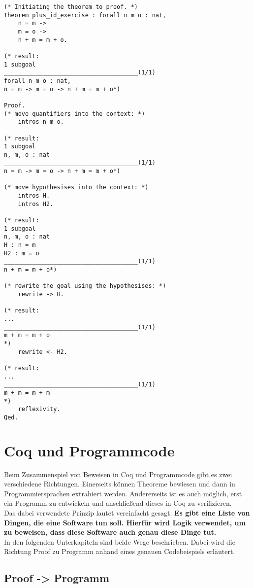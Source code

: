 \begin{lstlisting}[language=coq,firstnumber=1,caption=Coq Beispielbeweis,label=lst:sample-proof2]
(* Initiating the theorem to proof. *)
Theorem plus_id_exercise : forall n m o : nat,
	n = m ->
	m = o ->
	n + m = m + o.
	
(* result: 
1 subgoal
______________________________________(1/1)
forall n m o : nat,
n = m -> m = o -> n + m = m + o*)

Proof.
(* move quantifiers into the context: *)
	intros n m o. 
	
(* result: 
1 subgoal
n, m, o : nat
______________________________________(1/1)
n = m -> m = o -> n + m = m + o*)

(* move hypothesises into the context: *)	
	intros H.
	intros H2.

(* result: 
1 subgoal
n, m, o : nat
H : n = m
H2 : m = o
______________________________________(1/1)
n + m = m + o*)

(* rewrite the goal using the hypothesises: *)
	rewrite -> H.

(* result: 
...
______________________________________(1/1)
m + m = m + o
*)
	rewrite <- H2.

(* result:
...
______________________________________(1/1)
m + m = m + m
*)
	reflexivity.
Qed.
\end{lstlisting}

\section{Coq und Programmcode}
\label{s:coq-and-code}

Beim Zusammenspiel von Beweisen in Coq und Programmcode gibt es zwei verschiedene Richtungen. Einerseits können Theoreme bewiesen und dann in Programmiersprachen extrahiert werden. Andererseits ist es auch möglich, erst ein Programm zu entwickeln und anschließend dieses in Coq zu verifizieren. \\
Das dabei verwendete Prinzip lautet vereinfacht gesagt:
\textbf{Es gibt eine Liste von Dingen, die eine Software tun soll. Hierfür wird Logik verwendet, um zu beweisen, dass diese Software auch genau diese Dinge tut.}
\\
In den folgenden Unterkapiteln sind beide Wege beschrieben. Dabei wird die Richtung Proof zu Programm anhand eines genauen Codebeispiels erläutert.

\subsection{Proof -> Programm}
